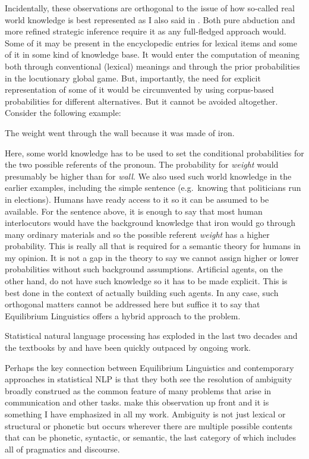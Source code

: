 Incidentally, these observations are orthogonal to the issue of how so-called real world knowledge is best represented as I also said in . Both pure abduction and more refined strategic inference require it as any full-fledged approach would. Some of it may be present in the encyclopedic entries for lexical items and some of it in some kind of knowledge base. It would enter the computation of meaning both through conventional (lexical) meanings and through the prior probabilities in the locutionary global game. But, importantly, the need for explicit representation of some of it would be circumvented by using corpus-based probabilities for different alternatives. But it cannot be avoided altogether. Consider the following example:

\ea The weight went through the wall because it was made of iron.\z

\noindent Here, some world knowledge has to be used to set the conditional probabilities for the two possible referents of the pronoun. The probability for \emph{weight} would presumably be higher than for \emph{wall}. We also used such world knowledge in the earlier examples, including the simple sentence  (e.g.\ knowing that politicians run in elections). Humans have ready access to it so it can be assumed to be available. For the sentence above, it is enough to say that most human interlocutors would have the background knowledge that iron would go through many ordinary materials and so the possible referent \emph{weight} has a higher probability. This is really all that is required for a semantic theory for humans in my opinion. It is not a gap in the theory to say we cannot assign higher or lower probabilities without such background assumptions. Artificial agents, on the other hand, do not have such knowledge so it has to be made explicit. This is best done in the context of actually building such agents. In any case, such orthogonal matters cannot be addressed here but suffice it to say that Equilibrium Linguistics offers a hybrid approach to the problem.

Statistical natural language processing  has exploded in the last two decades and the textbooks by \citet{ms:fsnlp} and \citet{jm:slp, jm:slp2} have been quickly outpaced by ongoing work.

Perhaps the key connection between Equilibrium Linguistics and contemporary approaches in statistical NLP is that they both see the resolution of ambiguity broadly construed as the common feature of many problems that arise in communication and other tasks. \citet[Section~1.2]{jm:slp2} make this observation up front and it is something I have emphasized in all my work. Ambiguity is not just lexical or structural or phonetic but occurs wherever there are multiple possible contents that can be phonetic, syntactic, or semantic, the last category of which includes all of pragmatics and discourse.

